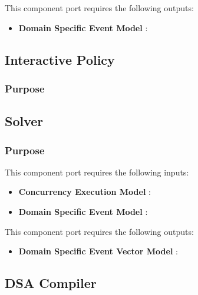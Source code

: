 \documentclass{gemoc} %
\begin{document}
This component port requires the following outputs:
\begin{itemize}
  \item \textbf{Domain Specific Event Model} :
\end{itemize}

\subsection{Interactive Policy}


\subsubsection{Purpose}



\subsection{Solver}


\subsubsection{Purpose}

This component port requires the following inputs:
\begin{itemize}
  \item \textbf{Concurrency Execution Model} :
  \item \textbf{Domain Specific Event Model} :
\end{itemize}

This component port requires the following outputs:
\begin{itemize}
  \item \textbf{Domain Specific Event Vector Model} :
\end{itemize}

\subsection{DSA Compiler}
\end{document}
